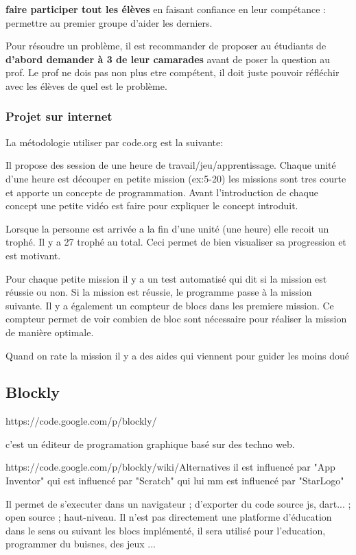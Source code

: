 \textbf{faire participer tout les élèves} en faisant confiance en leur compétance : permettre au premier groupe d'aider les derniers.

Pour résoudre un problème, il est recommander de proposer au étudiants de \textbf{d'abord demander à 3 de leur camarades} avant de poser la question au prof. Le prof ne dois pas non plus etre compétent, il doit juste pouvoir réfléchir avec les élèves de quel est le problème.

\subsubsection{Projet sur internet}
La métodologie utiliser par code.org est la suivante:

Il propose des session de une heure de travail/jeu/apprentissage. Chaque unité d'une heure est découper en petite mission (ex:5-20) les missions sont tres courte et apporte un concepte de programmation. Avant l'introduction de chaque concept une petite vidéo est faire pour expliquer le concept introduit.

Lorsque la personne est arrivée a la fin d'une unité (une heure) elle recoit un trophé. Il y a 27 trophé au total. Ceci permet de bien visualiser sa progression et est motivant.

Pour chaque petite mission il y a un test automatisé qui dit si la mission est réussie ou non. Si la mission est réussie, le programme passe à la mission suivante. Il y a également un compteur de blocs dans les premiere mission. Ce compteur permet de voir combien de bloc sont nécessaire pour réaliser la mission de manière optimale.

Quand on rate la mission il y a des aides qui viennent pour guider les moins doué

\subsection{Blockly}
https://code.google.com/p/blockly/

c'est un éditeur de programation graphique basé sur des techno web. 

https://code.google.com/p/blockly/wiki/Alternatives
il est influencé par "App Inventor" qui est influencé par "Scratch" qui lui mm est influencé par "StarLogo"

Il permet de s'executer dans un navigateur ; d'exporter du code source js, dart... ; open source ; haut-niveau.
Il n'est pas directement une platforme d'éducation dans le sens ou suivant les blocs implémenté, il sera utilisé pour l'education, programmer du buisnes, des jeux ...

